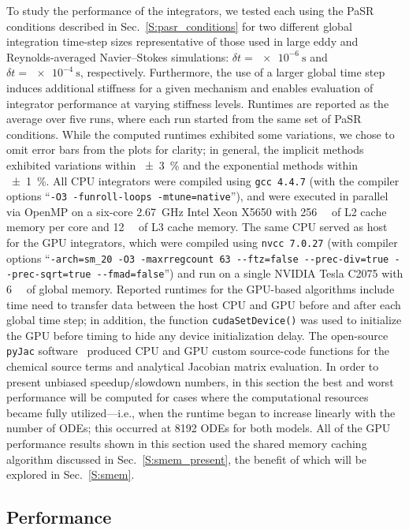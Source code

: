 \documentclass[preprint]{elsarticle}
\begin{document}
To study the performance of the integrators, we tested each using the PaSR conditions described in Sec.~\ref{S:pasr_conditions} for two different global integration time-step sizes representative of those used in large eddy and Reynolds-averaged Navier--Stokes simulations: $\delta t = \SI{e-6}{\s}$ and $\delta t = \SI{e-4}{\s}$, respectively.
Furthermore, the use of a larger global time step induces additional stiffness for a given mechanism and enables evaluation of integrator performance at varying stiffness levels.
Runtimes are reported as the average over five runs, where each run started from the same set of PaSR conditions.
While the computed runtimes exhibited some variations, we chose to omit error bars from the plots for clarity; in general, the implicit methods exhibited variations within \SI{\pm3}{\percent} and the exponential methods within \SI{\pm1}{\percent}.
All CPU integrators were compiled using \texttt{gcc 4.4.7} (with the compiler options ``\texttt{-O3 -funroll-loops -mtune=native}''), and were executed in parallel via OpenMP on a six-core \SI{2.67}{\giga\hertz} Intel Xeon X5650 with \SI{256}{\kilo\byte} of L2 cache memory per core and \SI{12}{\mega\byte} of L3 cache memory.
The same CPU served as host for the GPU integrators, which were compiled using \texttt{nvcc 7.0.27} (with compiler options ``\texttt{-arch=sm\_20 -O3 -maxrregcount 63 -{}-ftz=false -{}-prec-div=true -{}-prec-sqrt=true -{}-fmad=false}'') and run on a single NVIDIA Tesla C2075 with \SI{6}{\giga\byte} of global memory.
Reported runtimes for the GPU-based algorithms include time need to transfer data between the host CPU and GPU before and after each global time step; in addition, the function \texttt{cudaSetDevice()} was used to initialize the GPU before timing to hide any device initialization delay.
The open-source \texttt{pyJac} software~\cite{Niemeyer:2015im,Niemeyer:2015ws} produced CPU and GPU custom source-code functions for the chemical source terms and analytical Jacobian matrix evaluation.
In order to present unbiased speedup\slash slowdown numbers, in this section the best and worst performance will be computed for cases where the computational resources became fully utilized---i.e., when the runtime began to increase linearly with the number of ODEs; this occurred at \num{8192} ODEs for both models.
All of the GPU performance results shown in this section used the shared memory caching algorithm discussed in Sec.~\ref{S:smem_present}, the benefit of which will be explored in Sec.~\ref{S:smem}.

\subsection{Performance}
\end{document}
